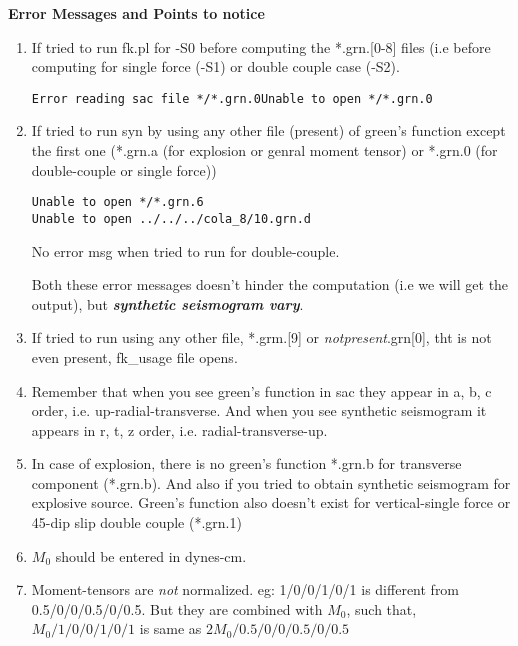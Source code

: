 \documentclass[11pt,titlepage,fleqn]{article}
\begin{document}
\begin{flushright}
\citep{Herrmann_1980}
\citep{Jost_Herrmann_1989}
\end{flushright}

{\bf Error Messages and Points to notice}
\begin{enumerate}
\item If tried to run fk.pl for -S0 before computing the *.grn.[0-8] files (i.e before computing for single force (-S1) or double couple case (-S2).
\begin{verbatim}
Error reading sac file */*.grn.0Unable to open */*.grn.0
\end{verbatim}

\item If tried to run syn by using any other file (present) of green's function except the first one (*.grn.a (for explosion or genral moment tensor) or *.grn.0 (for double-couple or single force))
\begin{verbatim}
Unable to open */*.grn.6
Unable to open ../../../cola_8/10.grn.d
\end{verbatim}
No error msg when tried to run for double-couple.

Both these error messages doesn't hinder the computation (i.e we will get the output), but {\bf {\em synthetic seismogram vary}}.
\item If tried to run using any other file, *.grm.[9] or {\em notpresent}.grn[0], tht is not even present, fk\_usage file opens.


\item Remember that when you see green's function in sac they appear in a, b, c order, i.e. up-radial-transverse.
And when you see synthetic seismogram it appears in r, t, z order, i.e. radial-transverse-up.

\item In case of explosion, there is no green's function *.grn.b for transverse component (*.grn.b). And also if you tried to obtain synthetic seismogram for explosive source. Green's function also doesn't exist for vertical-single force or 45-dip slip double couple (*.grn.1)

\item $M_0$ should be entered in dynes-cm. 

\item Moment-tensors are {\em not} normalized. eg: 1/0/0/1/0/1 is different from 0.5/0/0/0.5/0/0.5. But they are combined with $M_0$, such that, $M_0/1/0/0/1/0/1$ is same as $2M_0/0.5/0/0/0.5/0/0.5$


\end{enumerate}
\end{document}
